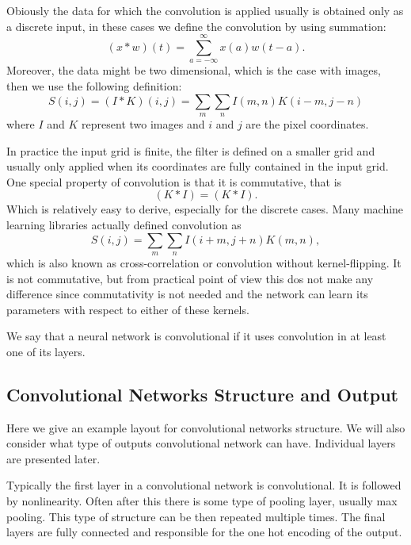 \documentclass[]{article}
\begin{document}
Obiously the data for which the convolution is applied usually is obtained only
as a discrete input, in these cases we define the convolution by using
summation:
\[
(x * w)(t) = \sum_{a = -\infty}^{\infty} x(a)w(t - a).
\]
Moreover, the data might be two dimensional, which is the case with images, then
we use the following definition:
\[
S(i, j) = (I * K)(i, j) = \sum_m \sum_n I(m , n) K(i - m, j - n)
\]
where $I$ and $K$ represent two images and $i$ and $j$ are the pixel coordinates.

In practice the input grid is finite, the filter is defined on a smaller grid and
usually only applied when its coordinates are fully contained in the input grid.
One special property of convolution is that it is commutative, that is
\[
 (K * I) = (K * I).
\]
Which is relatively easy to derive, especially for the discrete cases. Many machine
learning libraries actually defined convolution as
\[
S(i, j) = \sum_m \sum_n I(i + m , j + n) K(m, n),
\]
which is also known as cross-correlation or convolution without kernel-flipping.
It is not commutative, but from practical point of view this dos not make any difference
since commutativity is not needed and the network can learn its parameters with
respect to either of these kernels.

We say that a neural network is convolutional if it uses convolution in at least
one of its layers.


\subsection{Convolutional Networks Structure and Output}
Here we give an example layout for convolutional networks structure. We will also
consider what type of outputs convolutional network can have. Individual layers are
presented later.

Typically the first layer in a convolutional network is convolutional. It is followed
by nonlinearity. Often after this there is some type of pooling layer, usually max
pooling. This type of structure can be then repeated multiple times. The final layers are
fully connected and responsible for the one hot encoding of the output.
\end{document}
